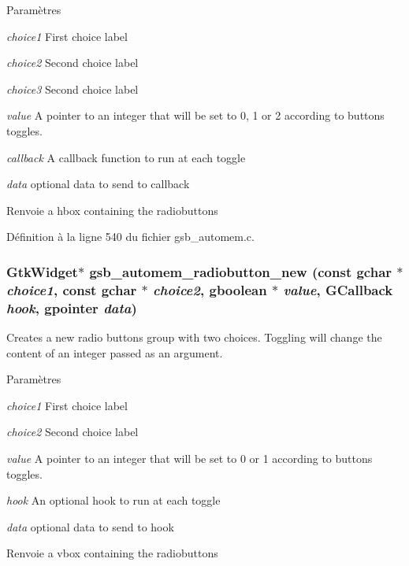 \begin{DoxyParams}{Paramètres}
\item[{\em choice1}]First choice label \item[{\em choice2}]Second choice label \item[{\em choice3}]Second choice label \item[{\em value}]A pointer to an integer that will be set to 0, 1 or 2 according to buttons toggles. \item[{\em callback}]A callback function to run at each toggle \item[{\em data}]optional data to send to callback\end{DoxyParams}
\begin{DoxyReturn}{Renvoie}
a hbox containing the radiobuttons 
\end{DoxyReturn}


Définition à la ligne 540 du fichier gsb\_\-automem.c.

\subsubsection[{gsb\_\-automem\_\-radiobutton\_\-new}]{\setlength{\rightskip}{0pt plus 5cm}GtkWidget$\ast$ gsb\_\-automem\_\-radiobutton\_\-new (const gchar $\ast$ {\em choice1}, \/  const gchar $\ast$ {\em choice2}, \/  gboolean $\ast$ {\em value}, \/  GCallback {\em hook}, \/  gpointer {\em data})}\label{gsb__automem_8h_a6ec9c54665a83656960dda412714f34f}
Creates a new radio buttons group with two choices. Toggling will change the content of an integer passed as an argument.


\begin{DoxyParams}{Paramètres}
\item[{\em choice1}]First choice label \item[{\em choice2}]Second choice label \item[{\em value}]A pointer to an integer that will be set to 0 or 1 according to buttons toggles. \item[{\em hook}]An optional hook to run at each toggle \item[{\em data}]optional data to send to hook\end{DoxyParams}
\begin{DoxyReturn}{Renvoie}
a vbox containing the radiobuttons 
\end{DoxyReturn}


